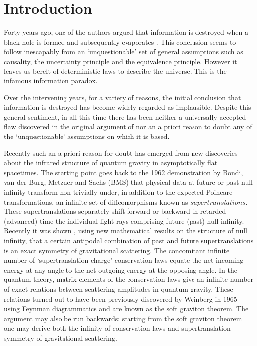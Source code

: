 \documentclass[12pt]{article}
\numberwithin{equation}{section}
\def\p{\partial}
\def\bz{{\bar z}}
\begin{document}
\def\gzz{\gamma_{z\bz}}
\def\gzu{\gamma^{z\bz}}
\def\vx{{\vec x}}
\def\p{\partial}
\def\po{$\cal P_O$}
\def\cN{{\cal N} }
\def\N{${\cal N}~ $}
\def\G{\Gamma}
\def\l{\ell }

\tableofcontents

\newpage

\section{Introduction}

Forty years ago, one of the authors argued \cite{swh} that information is destroyed when a black hole is formed and subsequently evaporates \cite{Hawking:1974rv,Hawking:1974sw}. This conclusion seems to follow inescapably from an `unquestionable' set of general assumptions
such as causality, the uncertainty principle and the equivalence principle.  However it leaves us bereft of deterministic laws to describe the universe. This is the infamous information paradox. 


Over the intervening years, for a variety of reasons,  the initial conclusion that information is destroyed has become widely regarded as implausible.  Despite this general sentiment, in all this time there has been neither a universally accepted flaw discovered in the  original argument of \cite{swh} nor an a priori reason to doubt any of the `unquestionable' assumptions on which it is based.  

Recently such an a priori reason for doubt has emerged from new discoveries about the infrared structure of quantum gravity  in asymptotically flat spacetimes.  The starting point goes back to the  1962 demonstration by  Bondi, van der Burg, Metzner and Sachs \cite{bms} (BMS) that physical data at future or past null infinity transform non-trivially under, in addition to the expected Poincare transformations, an infinite set of diffeomorphisms known as $supertranslations$. 
These supertranslations separately shift forward or backward in retarded (advanced) time the individual light rays 
comprising future (past) null infinity.  Recently it was shown \cite{Strominger:2013jfa}, using new mathematical results 
\cite{ck} on the structure of null infinity, that a certain antipodal combination of past and future supertranslations is an exact symmetry of gravitational scattering.  The concomitant  infinite number of `supertranslation charge'  conservation laws equate the net 
incoming energy at any angle to the net outgoing energy at the opposing angle. In the quantum theory, matrix elements of the conservation laws give an infinite number of exact relations between scattering amplitudes in quantum gravity. These relations turned out \cite{He:2014laa} to have been previously discovered by Weinberg in 1965 \cite{Weinberg} using Feynman diagrammatics and are known as the soft graviton theorem. The argument may also be run backwards: starting from the soft graviton theorem one may derive both the infinity of conservation laws and supertranslation symmetry of gravitational scattering. 
\end{document}
